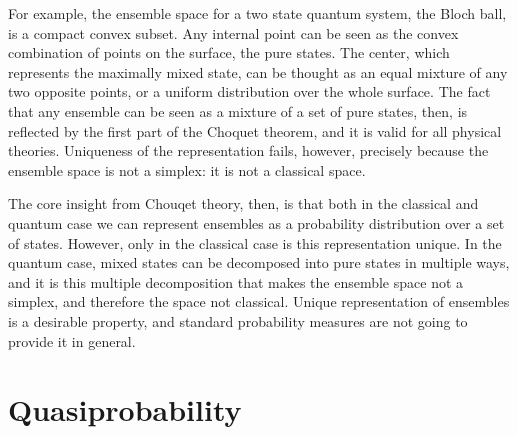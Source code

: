 \documentclass[10pt,twocolumn, nofootinbib]{revtex4-2}
\begin{document}
For example, the ensemble space for a two state quantum system, the Bloch ball, is a compact convex subset. Any internal point can be seen as the convex combination of points on the surface, the pure states. The center, which represents the maximally mixed state, can be thought as an equal mixture of any two opposite points, or a uniform distribution over the whole surface. The fact that any ensemble can be seen as a mixture of a set of pure states, then, is reflected by the first part of the Choquet theorem, and it is valid for all physical theories. Uniqueness of the representation fails, however, precisely because the ensemble space is not a simplex: it is not a classical space.

The core insight from Chouqet theory, then, is that both in the classical and quantum case we can represent ensembles as a probability distribution over a set of states. However, only in the classical case is this representation unique. In the quantum case, mixed states can be decomposed into pure states in multiple ways, and it is this multiple decomposition that makes the ensemble space not a simplex, and therefore the space not classical. Unique representation of ensembles is a desirable property, and standard probability measures are not going to provide it in general.

\section{Quasiprobability}




\end{document}
